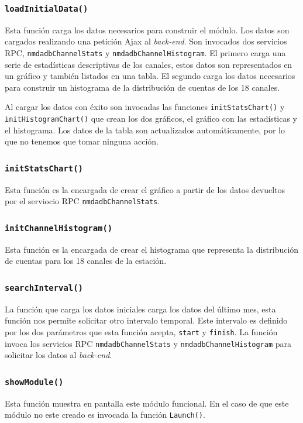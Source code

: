 		\subsubsection{\texttt{loadInitialData()}}
			Esta función carga los datos necesarios para construir el módulo. Los datos son cargados realizando una petición Ajax al
			\emph{back-end}. Son invocados dos servicios RPC, \texttt{nmdadbChannelStats} y \texttt{nmdadbChannelHistogram}. El primero
			carga una serie de estadísticas descriptivas de los canales, estos datos son representados en un gráfico y también listados en
			una tabla. El segundo carga los datos necesarios para construir un histograma de la distribución de cuentas de los 18 canales.
			\par
			Al cargar los datos con éxito son invocadas las funciones \texttt{initStatsChart()} y \texttt{initHistogramChart()} que  crean
			los dos gráficos, el gráfico con las estadísticas y el histograma. Los datos de la tabla son actualizados automáticamente, por
			lo que no tenemos que tomar ninguna acción.
		\subsubsection{\texttt{initStatsChart()}}
			Esta función es la encargada de crear el gráfico a partir de los datos devueltos por el serviocio RPC
			\texttt{nmdadbChannelStats}. 
		\subsubsection{\texttt{initChannelHistogram()}}
			Esta función es la encargada de crear el histograma que representa la distribución de cuentas para los 18 canales de la
			estación.
		\subsubsection{\texttt{searchInterval()}}
			La función que carga los datos iniciales carga los datos del último mes, esta función nos permite solicitar otro intervalo
			temporal. Este intervalo es definido por los dos parámetros que esta función acepta, \texttt{start} y \texttt{finish}. La
			función invoca los servicios RPC \texttt{nmdadbChannelStats} y \texttt{nmdadbChannelHistogram} para solicitar los datos al
			\emph{back-end}.
		\subsubsection{\texttt{showModule()}}
			Esta función muestra en pantalla este módulo funcional. En el caso de que este módulo no este creado es invocada la función
			\texttt{Launch()}.

